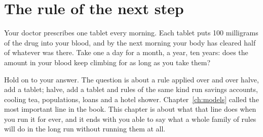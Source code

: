 
\chapter{The rule of the next step}
\label{ch:iteration}

\noindent
Your doctor prescribes one tablet every morning. Each tablet puts 100
milligrams of the drug into your blood, and by the next morning your body
has cleared half of whatever was there. Take one a day for a month, a year,
ten years: does the amount in your blood keep climbing for as long as you
take them?

Hold on to your answer. The question is about a rule applied over and over
\dash{} halve, add a tablet; halve, add a tablet \dash{} and rules of the
same kind run savings accounts, cooling tea, populations, loans and a hotel
shower. Chapter~\ref{ch:models} called  the
most important line in the book. This chapter is about what that line does
when you run it for ever, and it ends with you able to say what a whole
family of rules will do in the long run without running them at all.

\begin{outcomes}
\end{outcomes}

